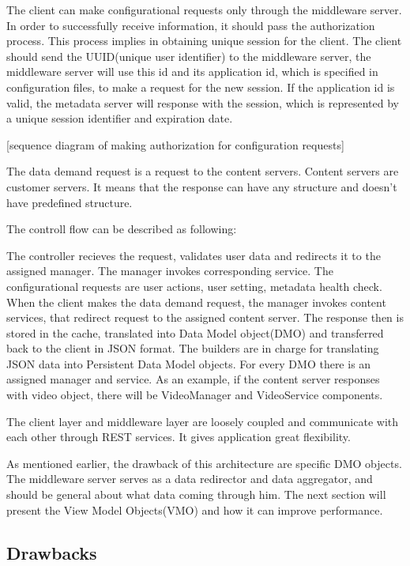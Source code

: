 The client can make configurational requests only through the middleware server. In order to successfully receive information, it should pass the authorization process. This process implies in obtaining unique session for the client. The client should send the UUID(unique user identifier) to the middleware server, the middleware server will use this id and its application id, which is specified in configuration files, to make a request for the new session. If the application id is valid, the metadata server will response with the session, which is represented by a unique session identifier and expiration date.

[sequence diagram of making authorization for configuration requests]

The data demand request is a request to the content servers. Content servers are customer servers. It means that the response can have any structure and doesn't have predefined structure. 

The controll flow can be described as following:

The controller recieves the request, validates user data and redirects it to the assigned manager. The manager  invokes corresponding service. The configurational requests are user actions, user setting, metadata health check. When the client makes the data demand request, the manager invokes content services, that redirect request to the assigned content server. The response then is stored in the cache, translated into Data Model object(DMO) and transferred back to the client in JSON format. The builders are in charge for translating JSON data into Persistent Data Model objects. For every DMO there is an assigned manager and service. As an example, if the content server responses with video object, there will be VideoManager and VideoService components.   

The client layer and middleware layer are loosely coupled and communicate with each other through REST services. It gives application great flexibility.

As mentioned earlier, the drawback of this architecture are specific DMO objects. The middleware server serves as a data redirector and data aggregator, and should be general about what data coming through him. The next section will present the View Model Objects(VMO) and how it can improve performance.


\subsection{Drawbacks}

